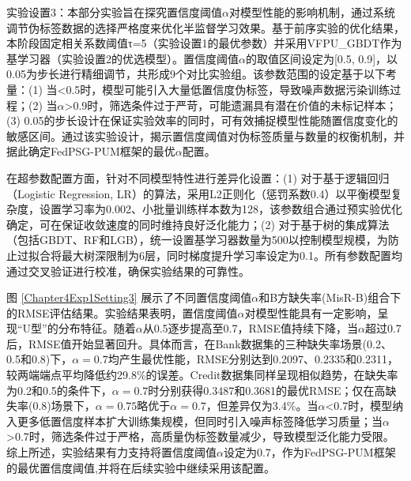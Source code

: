 实验设置3：本部分实验旨在探究置信度阈值$\alpha$对模型性能的影响机制，通过系统调节伪标签数据的选择严格度来优化半监督学习效果。基于前序实验的优化结果，本阶段固定相关系数阈值τ=5（实验设置1的最优参数）并采用VFPU\_GBDT作为基学习器（实验设置2的优选模型）。置信度阈值$\alpha$的取值区间设定为[0.5, 0.9]，以0.05为步长进行精细调节，共形成9个对比实验组。该参数范围的设定基于以下考量：(1) 当<0.5时，模型可能引入大量低置信度伪标签，导致噪声数据污染训练过程；(2) 当$\alpha$>0.9时，筛选条件过于严苛，可能遗漏具有潜在价值的未标记样本；(3) 0.05的步长设计在保证实验效率的同时，可有效捕捉模型性能随置信度变化的敏感区间。通过该实验设计，揭示置信度阈值对伪标签质量与数量的权衡机制，并据此确定FedPSG-PUM框架的最优$\alpha$配置。

在超参数配置方面，针对不同模型特性进行差异化设置：(1) 对于基于逻辑回归（Logistic Regression, LR）的算法，采用L2正则化（惩罚系数0.4）以平衡模型复杂度，设置学习率为0.002、小批量训练样本数为128，该参数组合通过预实验优化确定，可在保证收敛速度的同时维持良好泛化能力；(2) 对于基于树的集成算法（包括GBDT、RF和LGB），统一设置基学习器数量为500以控制模型规模，为防止过拟合将最大树深限制为6层，同时梯度提升学习率设定为0.1。所有参数配置均通过交叉验证进行校准，确保实验结果的可靠性。

图 \ref{Chapter4Exp1Setting3} 展示了不同置信度阈值$\alpha$和B方缺失率(MisR-B)组合下的RMSE评估结果。实验结果表明，置信度阈值$\alpha$对模型性能具有一定影响，呈现“U型”的分布特征。随着$\alpha$从0.5逐步提高至0.7，RMSE值持续下降，当$\alpha$超过0.7后，RMSE值开始显著回升。具体而言，在Bank数据集的三种缺失率场景(0.2、0.5和0.8)下，$\alpha=0.7$均产生最优性能，RMSE分别达到0.2097、0.2335和0.2311，较两端端点平均降低约29.8\%的误差。Credit数据集同样呈现相似趋势，在缺失率为0.2和0.5的条件下，$\alpha=0.7$时分别获得0.3487和0.3681的最优RMSE；仅在高缺失率(0.8)场景下，$\alpha=0.75$略优于$\alpha=0.7$，但差异仅为3.4\%。当$\alpha$<0.7时，模型纳入更多低置信度样本扩大训练集规模，但同时引入噪声标签降低学习质量；当$\alpha$>0.7时，筛选条件过于严格，高质量伪标签数量减少，导致模型泛化能力受限。综上所述，实验结果有力支持将置信度阈值$\alpha$设定为0.7，作为FedPSG-PUM框架的最优置信度阈值,并将在后续实验中继续采用该配置。

